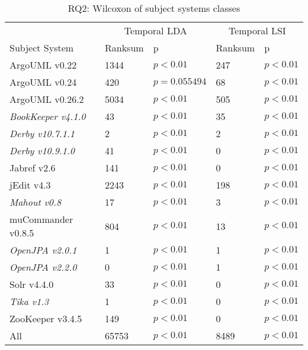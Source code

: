 \begin{table}[t]
\renewcommand{\arraystretch}{1.3}
\centering
\caption{RQ2: Wilcoxon of subject systems classes}
\begin{tabular}{l|ll|ll}
    \toprule
                        & \multicolumn{2}{c|}{Temporal LDA}      &  \multicolumn{2}{c}{Temporal LSI}  \\
    Subject System      & Ranksum & p & Ranksum & p \\
    \midrule
ArgoUML v0.22 & 1344 & $p < 0.01$ & 247 & $p < 0.01$ \\
ArgoUML v0.24 & 420 & $p = 0.055494$ & 68 & $p < 0.01$ \\
ArgoUML v0.26.2 & 5034 & $p < 0.01$ & 505 & $p < 0.01$ \\
{\it BookKeeper v4.1.0} & 43 & $p < 0.01$ & 35 & $p < 0.01$ \\
{\it Derby v10.7.1.1} & 2 & $p < 0.01$ & 2 & $p < 0.01$ \\
{\it Derby v10.9.1.0} & 41 & $p < 0.01$ & 0 & $p < 0.01$ \\
Jabref v2.6 & 141 & $p < 0.01$ & 0 & $p < 0.01$ \\
jEdit v4.3 & 2243 & $p < 0.01$ & 198 & $p < 0.01$ \\
{\it Mahout v0.8} & 17 & $p < 0.01$ & 3 & $p < 0.01$ \\
muCommander v0.8.5 & 804 & $p < 0.01$ & 13 & $p < 0.01$ \\
{\it OpenJPA v2.0.1} & 1 & $p < 0.01$ & 1 & $p < 0.01$ \\
{\it OpenJPA v2.2.0} & 0 & $p < 0.01$ & 1 & $p < 0.01$ \\
Solr v4.4.0 & 33 & $p < 0.01$ & 0 & $p < 0.01$ \\
{\it Tika v1.3} & 1 & $p < 0.01$ & 0 & $p < 0.01$ \\
ZooKeeper v3.4.5 & 149 & $p < 0.01$ & 0 & $p < 0.01$ \\
\midrule
All & 65753 & $p < 0.01$ & 8489 & $p < 0.01$ \\
    \bottomrule
\end{tabular}
\label{table:rq2:classstats}
\end{table}

